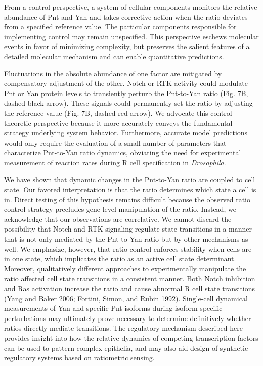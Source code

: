 From a control perspective, a system of cellular components monitors the relative abundance of Pnt and Yan and takes corrective action when the ratio deviates from a specified reference value. The particular components responsible for implementing control may remain unspecified. This perspective eschews molecular events in favor of minimizing complexity, but preserves the salient features of a detailed molecular mechanism and can enable quantitative predictions.

Fluctuations in the absolute abundance of one factor are mitigated by compensatory adjustment of the other. Notch or RTK activity could modulate Pnt or Yan protein levels to transiently perturb the Pnt-to-Yan ratio (Fig. 7B, dashed black arrow). These signals could permanently set the ratio by adjusting the reference value (Fig. 7B, dashed red arrow). We advocate this control theoretic perspective because it more accurately conveys the fundamental strategy underlying system behavior. Furthermore, accurate model predictions would only require the evaluation of a small number of parameters that characterize Pnt-to-Yan ratio dynamics, obviating the need for experimental measurement of reaction rates during R cell specification in \emph{Drosophila}.

We have shown that dynamic changes in the Pnt-to-Yan ratio are coupled to cell state. Our favored interpretation is that the ratio determines which state a cell is in. Direct testing of this hypothesis remains difficult because the observed ratio control strategy precludes gene-level manipulation of the ratio. Instead, we acknowledge that our observations are correlative. We cannot discard the possibility that Notch and RTK signaling regulate state transitions in a manner that is not only mediated by the Pnt-to-Yan ratio but by other mechanisms as well. We emphasize, however, that ratio control enforces stability when cells are in one state, which implicates the ratio as an active cell state determinant. Moreover, qualitatively different approaches to experimentally manipulate the ratio affected cell state transitions in a consistent manner. Both Notch inhibition and Ras activation increase the ratio and cause abnormal R cell state transitions (Yang and Baker 2006; Fortini, Simon, and Rubin 1992). Single-cell dynamical measurements of Yan and specific Pnt isoforms during isoform-specific perturbations may ultimately prove necessary to determine definitively whether ratios directly mediate transitions. The regulatory mechanism described here provides insight into how the relative dynamics of competing transcription factors can be used to pattern complex epithelia, and may also aid design of synthetic regulatory systems based on ratiometric sensing.


